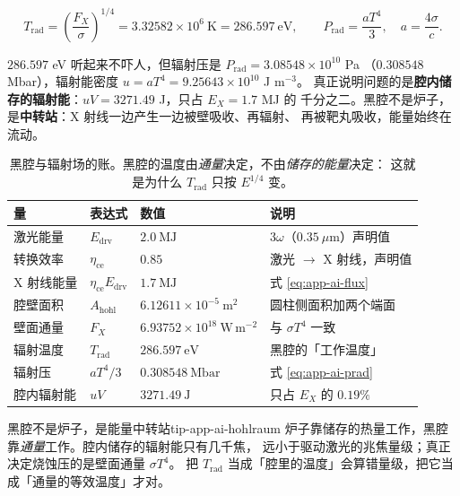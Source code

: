 \begin{equation}
T_{\mathrm{rad}} = \left(\frac{F_X}{\sigma}\right)^{1/4}
= 3.32582\times10^{6}\ \mathrm{K} = 286.597\ \mathrm{eV},
\qquad
P_{\mathrm{rad}} = \frac{a T^4}{3},\quad a = \frac{4\sigma}{c}.
\label{eq:app-ai-prad}
\end{equation}

$286.597$ eV 听起来不吓人，但辐射压是 $P_{\mathrm{rad}} = 3.08548\times10^{10}$ Pa
（$0.308548$ Mbar），辐射能密度 $u = aT^4 = 9.25643\times10^{10}$ J m$^{-3}$。
真正说明问题的是\textbf{腔内储存的辐射能}：$u V = 3271.49$ J，只占 $E_X = 1.7$ MJ 的
千分之二。黑腔不是炉子，是\textbf{中转站}：X 射线一边产生一边被壁吸收、再辐射、
再被靶丸吸收，能量始终在流动。

\begin{table}[htbp]
\centering
\small
\caption{黑腔与辐射场的账。黑腔的温度由\emph{通量}决定，不由\emph{储存的能量}决定：
这就是为什么 $T_{\mathrm{rad}}$ 只按 $E^{1/4}$ 变。}
\label{tab:app-ai-drive}
\begin{tabular}{p{3.4cm}p{3.0cm}p{3.4cm}p{3.6cm}}
\toprule
量 & 表达式 & 数值 & 说明 \\
\midrule
激光能量 & $E_{\mathrm{drv}}$ & $2.0\ \mathrm{MJ}$ & 3$\omega$（$0.35\ \mu$m）声明值 \\
转换效率 & $\eta_{\mathrm{ce}}$ & $0.85$ & 激光 $\to$ X 射线，声明值 \\
X 射线能量 & $\eta_{\mathrm{ce}}E_{\mathrm{drv}}$ & $1.7\ \mathrm{MJ}$ & 式 \eqref{eq:app-ai-flux} \\
腔壁面积 & $A_{\mathrm{hohl}}$ & $6.12611\times10^{-5}\ \mathrm{m^2}$ & 圆柱侧面积加两个端面 \\
壁面通量 & $F_X$ & $6.93752\times10^{18}\ \mathrm{W\,m^{-2}}$ & 与 $\sigma T^4$ 一致 \\
辐射温度 & $T_{\mathrm{rad}}$ & $286.597\ \mathrm{eV}$ & 黑腔的「工作温度」 \\
辐射压 & $aT^4/3$ & $0.308548\ \mathrm{Mbar}$ & 式 \eqref{eq:app-ai-prad} \\
腔内辐射能 & $uV$ & $3271.49\ \mathrm{J}$ & 只占 $E_X$ 的 $0.19\%$ \\
\bottomrule
\end{tabular}

\end{table}

\begin{tip}{黑腔不是炉子，是能量中转站}{tip-app-ai-hohlraum}
炉子靠储存的热量工作，黑腔靠\emph{通量}工作。腔内储存的辐射能只有几千焦，
远小于驱动激光的兆焦量级；真正决定烧蚀压的是壁面通量 $\sigma T^4$。
把 $T_{\mathrm{rad}}$ 当成「腔里的温度」会算错量级，把它当成「通量的等效温度」才对。
\end{tip}

